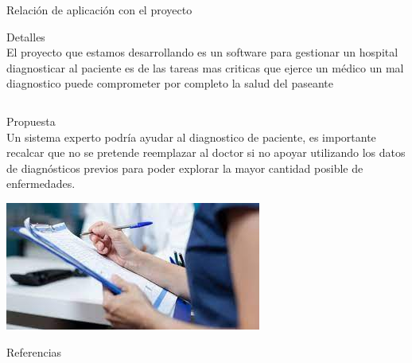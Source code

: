 \documentclass[aspectratio=169, 9pt]{beamer}
\begin{document}
\begin{frame}[label={sec:org6eb8e1d}]{Relación de aplicación con el proyecto}
\begin{threec}
\alert{Detalles} \\
El proyecto que estamos desarrollando es un software para gestionar un hospital
diagnosticar al paciente es de las tareas mas criticas que ejerce un médico
un mal diagnostico puede comprometer por completo la salud del paseante

\begin{center}
\begin{tabular}{l}
\\
\end{tabular}

\end{center}

\alert{Propuesta} \\
Un sistema experto podría ayudar al diagnostico de paciente, es importante 
recalcar que no se pretende reemplazar al doctor si no apoyar utilizando
los datos de diagnósticos previos para poder explorar la mayor cantidad posible
de enfermedades.
\end{threec}
\begin{twoc}
\begin{center}
\includegraphics[width=.9\linewidth]{images/diag.jpeg}
\end{center}
\end{twoc}
\end{frame}


\begin{frame}[label={sec:orgd735547}]{Referencias}
\printbibliography
\end{frame}
\end{document}
